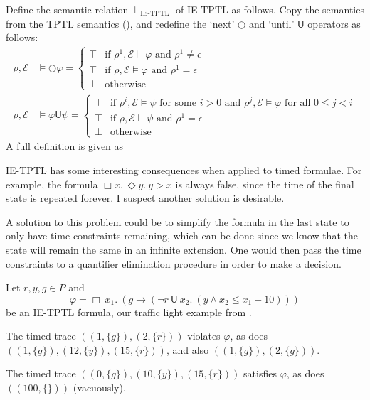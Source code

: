 \documentclass[a4paper]{article}
\newcommand{\U}{\mathsf{U}}
\newcommand{\tand}{\text{ and }}
\newcommand{\fsome}{\text{ for some }}
\newcommand{\fall}{\text{ for all }}
\newcommand{\eval}{\mathcal{E}}
\begin{document}
\begin{defn}\label{ietptlsem}

  Define the semantic relation $\vDash_{\text{IE-TPTL}}$ of IE-TPTL as follows. Copy the semantics from the TPTL semantics (), and redefine the `next' $\bigcirc$ and `until' $\U$ operators as follows:
  \begin{align*}
    \rho,\eval&\vDash \bigcirc \varphi =
    \begin{cases}
      \top &\text{if } \rho^1,\eval \vDash \varphi \tand \rho^1 \ne \epsilon\\
      \top &\text{if } \rho,\eval\vDash \varphi \tand \rho^1 = \epsilon\\
      \bot &\text{otherwise}
    \end{cases}\\
    \rho,\eval&\vDash \varphi \U \psi =
    \begin{cases}
      \top &\text{if } \rho^i,\eval \vDash \psi \fsome i > 0 \tand \rho^j,\eval \vDash \varphi \fall 0 \leq j < i\\
      \top &\text{if } \rho,\eval\vDash \psi \tand \rho^1 = \epsilon\\
      \bot &\text{otherwise}
    \end{cases}
  \end{align*}
  A full definition is given as 
\end{defn}

\begin{remk}
IE-TPTL has some interesting consequences when applied to timed formulae. For example, the formula $\Box x.~ \Diamond y.~ y > x$ is always false, since the time of the final state is repeated forever. I suspect another solution is desirable.

A solution to this problem could be to simplify the formula in the last state to only have time constraints remaining, which can be done since we know that the state will remain the same in an infinite extension. One would then pass the time constraints to a quantifier elimination procedure in order to make a decision.
\end{remk}

\begin{eg}\label{ietptleg}
  Let $r,y,g\in P$ and \[\varphi = \Box ~x_1.~ (g \to (\neg r ~\U~ x_2.~ (y \land x_2 \leq x_1 + 10) ))\] be an IE-TPTL formula, our traffic light example from .

  The timed trace $((1,\{g\}),(2,\{r\}))$ violates $\varphi$, as does $((1,\{g\}),(12,\{y\}),(15,\{r\}))$, and also $((1,\{g\}),(2,\{g\}))$.

  The timed trace $((0,\{g\}),(10,\{y\}),(15,\{r\}))$ satisfies $\varphi$, as does $((100,\{\}))$ (vacuously).
\end{eg}
\end{document}
